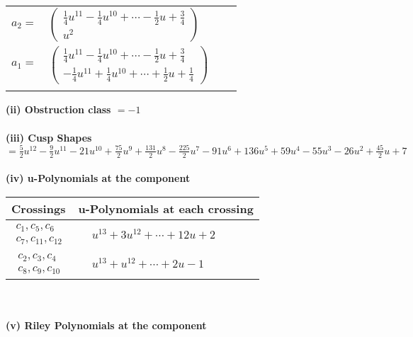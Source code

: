 \documentclass[1p]{elsarticle_modified}
\theoremstyle{definition}
\begin{document}
\begin{tabular}{m{7pt} m{180pt} m{7pt} m{180pt} }
\flushright $a_{2}=$&$\begin{pmatrix}\frac{1}{4} u^{11}-\frac{1}{4} u^{10}+\cdots-\frac{1}{2} u+\frac{3}{4}\\u^2\end{pmatrix}$ \\
\flushright $a_{1}=$&$\begin{pmatrix}\frac{1}{4} u^{11}-\frac{1}{4} u^{10}+\cdots-\frac{1}{2} u+\frac{3}{4}\\-\frac{1}{4} u^{11}+\frac{1}{4} u^{10}+\cdots+\frac{1}{2} u+\frac{1}{4}\end{pmatrix}$\\&\end{tabular}
\flushleft \textbf{(ii) Obstruction class $= -1$}\\~\\
\flushleft \textbf{(iii) Cusp Shapes $= \frac{5}{2} u^{12}-\frac{9}{2} u^{11}-21 u^{10}+\frac{75}{2} u^9+\frac{131}{2} u^8-\frac{225}{2} u^7-91 u^6+136 u^5+59 u^4-55 u^3-26 u^2+\frac{45}{2} u+7$}\\~\\
\newpage\renewcommand{\arraystretch}{1}
\flushleft \textbf{(iv) u-Polynomials at the component}\newline \\
\begin{tabular}{m{50pt}|m{274pt}}
Crossings & \hspace{64pt}u-Polynomials at each crossing \\
\hline $$\begin{aligned}c_{1},c_{5},c_{6}\\c_{7},c_{11},c_{12}\end{aligned}$$&$\begin{aligned}
&u^{13}+3 u^{12}+\cdots+12 u+2
\end{aligned}$\\
\hline $$\begin{aligned}c_{2},c_{3},c_{4}\\c_{8},c_{9},c_{10}\end{aligned}$$&$\begin{aligned}
&u^{13}+u^{12}+\cdots+2 u-1
\end{aligned}$\\
\hline
\end{tabular}\\~\\
\newpage\renewcommand{\arraystretch}{1}
\flushleft \textbf{(v) Riley Polynomials at the component}\newline \\
\end{document}
